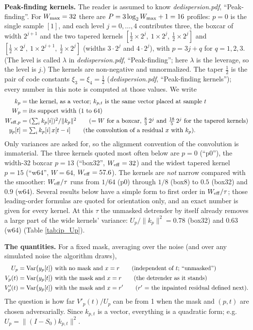\documentclass{article}
\numberwithin{equation}{section}   %
\def\nn{\nonumber}
\newcommand{\ddnotes}[1]{{\em dedispersion.pdf}, ``#1''}
\begin{document}
{\bf Peak-finding kernels.}  The reader is assumed to know \ddnotes{Peak-finding}.  For
$W_{\rm max} = 32$ there are $P = 3\log_2 W_{\rm max} + 1 = 16$ profiles: $p = 0$ is the single sample
$[1]$, and each level $j = 0,\ldots,4$ contributes three, the boxcar of width $2^{j+1}$ and the two
tapered kernels $[\tfrac12 \times 2^j,\ 1 \times 2^j,\ \tfrac12 \times 2^j]$ and
$[\tfrac12 \times 2^j,\ 1 \times 2^{j+1},\ \tfrac12 \times 2^j]$ (widths $3 \cdot 2^j$ and $4 \cdot 2^j$),
with $p = 3j + q$ for $q = 1,2,3$.  (The level is called $\lambda$ in \ddnotes{Peak-finding}; here
$\lambda$ is the leverage, so the level is $j$.)  The kernels are non-negative and unnormalized.
The taper $\tfrac12$ is the pair of code constants $\xi_3 = \xi_4 = \tfrac12$
(\ddnotes{Peak-finding kernels}); every number in this note is computed at those values.  We write
\begin{align}
k_p &= \mbox{the kernel, as a vector; $k_{p,t}$ is the same vector placed at sample $t$} \nn \\
W_p &= \mbox{its support width (1 to 64)} \nn \\
W_{{\rm eff},p} &= (\textstyle\sum_i k_p[i])^2 / \|k_p\|^2 \qquad
   \mbox{($= W$ for a boxcar, $\tfrac83\,2^j$ and $\tfrac{18}{5}\,2^j$ for the tapered kernels)} \nn \\
y_p[t] &= \textstyle\sum_i k_p[i]\, x[t-i] \qquad \mbox{(the convolution of a residual $x$ with $k_p$)} .
\label{eq:ip_kernels}
\end{align}
Only variances are asked for, so the alignment convention of the convolution is immaterial.  The three
kernels quoted most often below are $p = 0$ (``p0''), the width-32 boxcar $p = 13$ (``box32'',
$W_{\rm eff} = 32$) and the widest tapered kernel $p = 15$ (``w64'', $W = 64$, $W_{\rm eff} = 57.6$).
The kernels are {\em not} narrow compared with the smoother: $W_{\rm eff}/\tau$ runs from $1/64$ (p0)
through $1/8$ (box8) to $0.5$ (box32) and $0.9$ (w64).  Several results below have a simple form to
first order in $W_{\rm eff}/\tau$; those leading-order formulas are quoted for orientation only, and an
exact number is given for every kernel.  At this $\tau$ the unmasked detrender by itself already removes
a large part of the wide kernels' variance: $U_p/\|k_p\|^2 = 0.78$ (box32) and $0.63$ (w64)
(Table \ref{tab:ip_Up}).

{\bf The quantities.}  For a fixed mask, averaging over the noise (and over any simulated noise the
algorithm draws),
\begin{align}
U_p &= {\rm Var}\big(y_p[t]\big) \mbox{ with no mask and } x = r \qquad \mbox{(independent of $t$; ``unmasked'')} \nn \\
V_p(t) &= {\rm Var}\big(y_p[t]\big) \mbox{ with the mask and } x = r \qquad \mbox{(the detrender as it stands)} \nn \\
V'_p(t) &= {\rm Var}\big(y_p[t]\big) \mbox{ with the mask and } x = r' \qquad \mbox{($r'$ = the inpainted residual defined next)} .
\label{eq:ip_quantities}
\end{align}
The question is how far $V'_p(t)/U_p$ can be from 1 when the mask and $(p,t)$ are chosen adversarially.
Since $k_{p,t}$ is a vector, everything is a quadratic form; e.g.\ $U_p = \|(I - S_0)k_{p,t}\|^2$.
\end{document}
